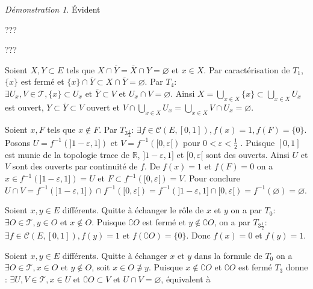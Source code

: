 \documentclass[a4paper, 11pt, french]{book}
\newenvironment{itemise}{\itemize}{\enditemize}
\theoremstyle{plain} %
\theoremstyle{definition} %
\theoremstyle{remark} %
\newtheorem*{demonstration}{Démonstration}
\newcommand{\1}{\mathds{1}}
\newcommand\vide{\varnothing}
\newcommand{\cont}{\mathcal{C}}
\newcommand{\inv}[1]{#1^{-1}}
\newcommand\et{\text{ et }}
\newcommand{\R}{\mathbb{R}}
\begin{document}
\begin{demonstration}
	\begin{itemise}
		\item[$T_5\Rightarrow T_4$ et $T_{2\frac{1}{2}}\Rightarrow T_2\Rightarrow T_1\Rightarrow T_0$:] Évident
		\item[$T_1+T_4\Rightarrow T_{3\frac{1}{2}}$:] {\color{green} ???}
		\item[$T_3+T_4\Rightarrow T_{3\frac{1}{2}}$:] {\color{green} ???}
			{\color{red}
				\item[$T_1+T_4\Rightarrow T_5$:] Soient $X, Y\subset E$ tels que $X\cap\overline{Y}=\overline{X}\cap Y=\vide$ et $x\in X$.
				Par caractérisation de $T_1$, $\{x\}$ est fermé et $\{x\}\cap\overline{Y}\subset X\cap\overline{Y}=\vide$.
				Par $T_4$: $\exists U_x, V\in\mathscr{T}, \{x\}\subset U_x\et\overline{Y}\subset V\et U_x\cap V=\vide$.
				Ainsi $X=\bigcup_{x\in X}\{x\}\subset\bigcup_{x\in X}U_x$ est ouvert, $Y\subset\overline{Y}\subset V$ ouvert et $V\cap\bigcup_{x\in X}U_x=\bigcup_{x\in X}V\cap U_x=\vide$.
			}
		\item[$T_{3\frac{1}{2}}\Rightarrow T_3$:] Soient $x, F$ tels que $x\notin F$.
		Par $T_{3\frac{1}{2}}$: $\exists f\in\cont(E, [0, 1]), f(x)=1, f(F)=\{0\}$.
		Posons $U=\inv{f}(]1-\varepsilon, 1])$ et $V=\inv{f}([0, \varepsilon[)$ pour $0<\varepsilon<\frac{1}{2}$ .
		Puisque $[0, 1]$ est munie de la topologie trace de $\R$, $]1-\varepsilon, 1]$ et $[0, \varepsilon[$ sont des ouverts.
		Ainsi $U$ et $V$ sont des ouverts par continuité de $f$.
		De $f(x)=1$ et $f(F)=0$ on a $x\in\inv{f}(]1-\varepsilon, 1])=U$ et $F\subset\inv{f}([0, \varepsilon[)=V$.
		Pour conclure $U\cap V=\inv{f}(]1-\varepsilon, 1])\cap\inv{f}([0, \varepsilon[)=\inv{f}(]1-\varepsilon, 1]\cap[0, \varepsilon[)=\inv{f}(\vide)=\vide$.
		\item[$T_0+T_{3\frac{1}{2}}\Rightarrow T_{2\frac{3}{4}}$:] Soient $x, y\in E$ différents.
		Quitte à échanger le rôle de $x$ et $y$ on a par $T_0$: $\exists O\in\mathscr{T}, y\in O\et x\notin O$.
		Puisque $\complement O$ est fermé et $y\notin\complement O$, on a par $T_{3\frac{1}{2}}$: $\exists f\in\cont(E, [0, 1]), f(y)=1\et f(\complement O)=\{0\}$.
		Donc $f(x)=0$ et $f(y)=1$.
		\item[$T_0+T_3\Rightarrow T_{2\frac{1}{2}}$:] Soient $x, y\in E$ différents.
		Quitte à échanger $x$ et $y$ dans la formule de $T_0$ on a $\exists O\in\mathscr{T}, x\in O\et y\notin O$, soit $x\in O\not\ni y$.
		Puisque $x\notin\complement O$ et $\complement O$ est fermé $T_3$ donne :
		$\exists U, V\in\mathscr{T}, x\in U\et\complement O\subset V\et U\cap V=\vide$, équivalent à

\end{itemise}
\end{demonstration}
\end{document}
